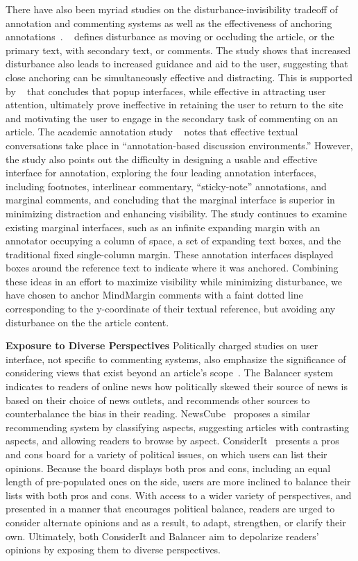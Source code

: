 There have also been myriad studies on the disturbance-invisibility tradeoff of annotation and commenting systems as well as the effectiveness of anchoring annotations~\cite{FluidDocs,Wikipedia,AnnotationsStudents}. ~\cite{FluidDocs} defines disturbance as moving or occluding the article, or the primary text, with secondary text, or comments. The study shows that increased disturbance also leads to increased guidance and aid to the user, suggesting that close anchoring can be simultaneously effective and distracting. This is supported by ~\cite{Wikipedia} that concludes that popup interfaces, while effective in attracting user attention, ultimately prove ineffective in retaining the user to return to the site and motivating the user to engage in the secondary task of commenting on an article.  The academic annotation study ~\cite{AnnotationsStudents} notes that effective textual conversations take place in ``annotation-based discussion environments.'' However, the study also points out the difficulty in designing a usable and effective interface for annotation, exploring the four leading annotation interfaces, including footnotes, interlinear commentary, ``sticky-note'' annotations, and marginal comments, and concluding that the marginal interface is superior in minimizing distraction and enhancing visibility. The study continues to examine existing marginal interfaces, such as an infinite expanding margin with an annotator occupying a column of space, a set of expanding text boxes, and the traditional fixed single-column margin. These annotation interfaces displayed boxes around the reference text to indicate where it was anchored. Combining these ideas in an effort to maximize visibility while minimizing disturbance, we have chosen to anchor MindMargin comments with a faint dotted line corresponding to the y-coordinate of their textual reference, but avoiding any disturbance on the the article content. 

\textbf{Exposure to Diverse Perspectives}
Politically charged studies on user interface, not specific to commenting systems, also emphasize the significance of considering views that exist beyond an article's scope~\cite{Politics,NewsCube,ConsiderIt}. The Balancer system~\cite{Politics} indicates to readers of online news how politically skewed their source of news is based on their choice of news outlets, and recommends other sources to counterbalance the bias in their reading. NewsCube~\cite{NewsCube} proposes a similar recommending system by classifying aspects, suggesting articles with contrasting aspects, and allowing readers to browse by aspect. ConsiderIt~\cite{ConsiderIt} presents a pros and cons board for a variety of political issues, on which users can list their opinions. Because the board displays both pros and cons, including an equal length of pre-populated ones on the side, users are more inclined to balance their lists with both pros and cons. With access to a wider variety of perspectives, and presented in a manner that encourages political balance, readers are urged to consider alternate opinions and as a result, to adapt, strengthen, or clarify their own. Ultimately, both ConsiderIt and Balancer aim to depolarize readers' opinions by exposing them to diverse perspectives.

